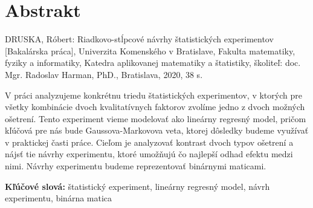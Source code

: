 \thispagestyle{empty}
\section*{Abstrakt}
DRUSKA, Róbert: Riadkovo-stĺpcové návrhy štatistických experimentov [Bakalárska práca],
Univerzita Komenského v Bratislave,
Fakulta matematiky, fyziky a informatiky,
Katedra aplikovanej matematiky a štatistiky,
školiteľ: doc. Mgr. Radoslav Harman, PhD.,
Bratislava, 2020, 38 s.

V práci analyzujeme konkrétnu triedu štatistických experimentov, v ktorých pre všetky kombinácie dvoch kvalitatívnych faktorov zvolíme jedno z dvoch možných ošetrení. 
Tento experiment vieme modelovať ako lineárny regresný model, pričom kľúčová pre nás bude Gaussova-Markovova veta, ktorej dôsledky budeme využívať v praktickej časti práce. 
Cieľom je analyzovať kontrast dvoch typov ošetrení a nájsť tie návrhy experimentu, ktoré umožňujú čo najlepší odhad efektu medzi nimi.
Návrhy experimentu budeme reprezentovať binárnymi maticami.

\begin{flushleft}
  \textbf{Kľúčové slová:} štatistický experiment, lineárny regresný model, návrh experimentu, binárna matica
\end{flushleft}